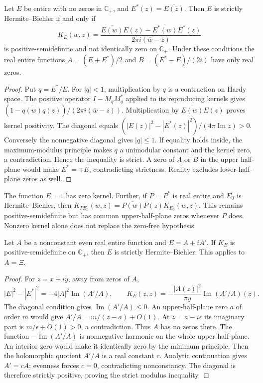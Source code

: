 \begin{proposition}
\label{v4-arith:w5-j:prop:HBplus-iff-kernel-positive}
Let \(E\) be entire with no zeros in \(\mathbb C_+\), and
\(E^*(z)=\overline{E(\overline z)}\). Then \(E\) is strictly
Hermite--Biehler if and only if
\[
 K_E(w,z)=\frac{\overline{E(w)}E(z)-\overline{E^*(w)}E^*(z)}
                   {2\pi i(\overline w-z)}
\]
is positive-semidefinite and not identically zero on \(\mathbb C_+\).
Under these conditions the real entire functions
\(A=(E+E^*)/2\) and \(B=(E^*-E)/(2i)\) have only real zeros.
\end{proposition}
\begin{proof}
Put \(q=E^*/E\). For \(|q|<1\), multiplication by \(q\) is a
contraction on Hardy space. The positive operator \(I-M_qM_q^*\)
applied to its reproducing kernels gives
\((1-\overline{q(w)}q(z))/(2\pi i(\overline w-z))\).
Multiplication by \(\overline{E(w)}E(z)\) proves kernel positivity.
The diagonal equals
\((|E(z)|^2-|E^*(z)|^2)/(4\pi\operatorname{Im}z)>0\).
Conversely the nonnegative diagonal gives \(|q|\le1\). If equality
holds inside, the maximum-modulus principle makes \(q\) a unimodular
constant and the kernel zero, a contradiction. Hence the inequality
is strict. A zero of \(A\) or \(B\) in the upper half-plane would
make \(E^*=\mp E\), contradicting strictness. Reality excludes
lower-half-plane zeros as well.
\end{proof}
\begin{remark}
The function \(E=1\) has zero kernel. Further, if \(P=P^*\) is
real entire and \(E_0\) is Hermite--Biehler, then
\(K_{PE_0}(w,z)=\overline{P(w)}P(z)K_{E_0}(w,z)\).
This remains positive-semidefinite but has common upper-half-plane
zeros whenever \(P\) does. Nonzero kernel alone does not replace
the zero-free hypothesis.
\end{remark}
\begin{proposition}
\label{v4-arith:w5-j:prop:derivative-datum-strict-HB}
Let \(A\) be a nonconstant even real entire function and
\(E=A+iA'\). If \(K_E\) is positive-semidefinite on
\(\mathbb C_+\), then \(E\) is strictly Hermite--Biehler.
This applies to \(A=\Xi\).
\end{proposition}
\begin{proof}
For \(z=x+iy\), away from zeros of \(A\),
\[
 |E|^2-|E^*|^2=-4|A|^2\operatorname{Im}(A'/A),\qquad
 K_E(z,z)=-\frac{|A(z)|^2}{\pi y}\operatorname{Im}(A'/A)(z).
\]
The diagonal condition gives \(\operatorname{Im}(A'/A)\le0\).
An upper-half-plane zero \(a\) of order \(m\) would give
\(A'/A=m/(z-a)+O(1)\). At \(z=a-i\epsilon\) its imaginary
part is \(m/\epsilon+O(1)>0\), a contradiction. Thus \(A\)
has no zeros there. The function \(-\operatorname{Im}(A'/A)\)
is nonnegative harmonic on the whole upper half-plane. An interior
zero would make it identically zero by the minimum principle.
Then the holomorphic quotient \(A'/A\) is a real constant \(c\).
Analytic continuation gives \(A'=cA\); evenness forces \(c=0\),
contradicting nonconstancy. The diagonal is therefore strictly
positive, proving the strict modulus inequality.
\end{proof}
